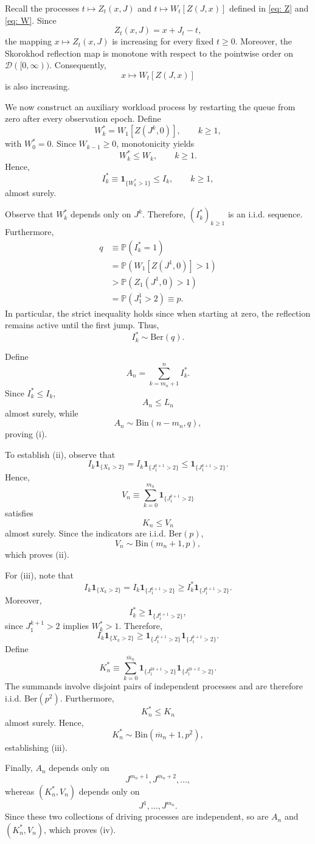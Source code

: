 \documentclass[10pt,a4paper]{amsart}
\newenvironment{proof}{\noindent{\bf Proof:}}{\endpf}
\begin{document}
\begin{proof}
Recall the processes
$t\mapsto Z_t(x,J)$
and
$t\mapsto W_t[Z(J,x)]$
defined in
\eqref{eq: Z}
and
\eqref{eq: W}.
Since
\[
Z_t(x,J)=x+J_t-t,
\]
the mapping
$x\mapsto Z_t(x,J)$
is increasing for every fixed $t\ge0$.
Moreover, the Skorokhod reflection map is monotone with respect to the pointwise order on
$\mathcal D([0,\infty))$.
Consequently,
\[
x\longmapsto W_t[Z(J,x)]
\]
is also increasing.

We now construct an auxiliary workload process by restarting the queue from zero after every observation epoch. Define
\[
W_k^*
=
W_1[Z(J^k,0)],
\qquad
k\ge1,
\]
with $W_0^*=0$.
Since $W_{k-1}\ge0$, monotonicity yields
\[
W_k^*\le W_k,
\qquad
k\ge1.
\]
Hence,
\[
I_k^*
\equiv
\mathbf1_{\{W_k^*>1\}}
\le
I_k,
\qquad
k\ge1,
\]
almost surely.

Observe that $W_k^*$ depends only on $J^k$.
Therefore,
$(I_k^*)_{k\ge1}$
is an i.i.d. sequence.
Furthermore,
\begin{align*}
q
&\equiv
\mathbb P(I_k^*=1)
\\
&=
\mathbb P\!\left(
W_1[Z(J^1,0)]>1
\right)
\\
&>
\mathbb P\!\left(
Z_1(J^1,0)>1
\right)
\\
&=
\mathbb P(J_1^1>2)
\equiv
p.
\end{align*}
In particular, the strict inequality holds since when starting at zero, the reflection remains active until the first jump.
Thus,
\[
I_k^*\sim\mathrm{Ber}(q).
\]

Define
\[
A_n
=
\sum_{k=m_n+1}^{n}I_k^*.
\]
Since $I_k^*\le I_k$,
\[
A_n\le L_n
\]
almost surely, while
\[
A_n\sim\mathrm{Bin}(n-m_n,q),
\]
proving (i).

To establish (ii), observe that
\[
I_k\mathbf1_{\{X_k>2\}}
=
I_k\mathbf1_{\{J^{k+1}_1>2\}}
\le
\mathbf1_{\{J^{k+1}_1>2\}}.
\]
Hence,
\[
V_n\equiv\sum_{k=0}^{m_n}
\mathbf1_{\{J^{k+1}_1>2\}}
\]
satisfies
\[
K_n\le V_n
\]
almost surely.
Since the indicators are i.i.d. Ber$(p)$,
\[
V_n\sim\mathrm{Bin}(m_n+1,p),
\]
which proves (ii).

For (iii), note that
\[
I_k
\mathbf1_{\{X_k>2\}}
=
I_k
\mathbf1_{\{J^{k+1}_1>2\}}
\ge
I_k^*
\mathbf1_{\{J^{k+1}_1>2\}}.
\]
Moreover,
\[
I_k^*
\geq
\mathbf1_{\{J^{k+1}_1>2\}}
,
\]
since
$J^{k+1}_1>2$
implies
$W_k^*>1$.
Therefore,
\[
I_k
\mathbf1_{\{X_k>2\}}
\ge
\mathbf1_{\{J^{k+1}_1>2\}}
\mathbf1_{\{J^{k+1}_1>2\}}.
\]
Define
\[
K_n^*\equiv
\sum_{k=0}^{\overline m_n}
\mathbf1_{\{J^{2k+1}_1>2\}}
\mathbf1_{\{J^{2k+2}_1>2\}}.
\]
The summands involve disjoint pairs of independent processes and are therefore i.i.d. Ber$(p^2)$.
Furthermore,
\[
K_n^*
\le
K_n
\]
almost surely.
Hence,
\[
K_n^*
\sim
\mathrm{Bin}(\overline m_n+1,p^2),
\]
establishing (iii).

Finally,
$A_n$
depends only on
\[
J^{m_n+1},
J^{m_n+2},
\ldots,
\]
whereas
$(K_n^*,V_n)$
depends only on
\[
J^1,\ldots,J^{m_n}.
\]
Since these two collections of driving processes are independent, so are
$A_n$
and
$(K_n^*,V_n)$,
which proves (iv).
\end{proof}
\end{document}
